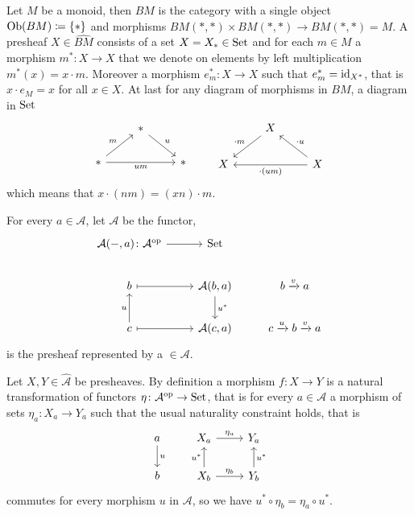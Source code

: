 \begin{exmp}
    Let $M$ be a monoid, then $BM$ is the category with a single object $\operatorname{Ob}(BM) \coloneqq \{*\}$ and morphisms $BM(*,*) \times BM(*,*) \to BM(*,*)=M$.
    A presheaf $X \in \widehat{BM}$ consists of a set $X=X_* \in \operatorname{Set}$ and for each $m \in M$ a morphism $m^*: X \to X$ that we denote on elements by left multiplication $m^*(x)=x \cdot m$.
    Moreover a morphism $e_m^*\colon X \to X$ such that $e_m^*=\operatorname{id}_{X^*}$, that is $x \cdot e_M=x$ for all $x \in X$.
    At last for any diagram of morphisms in $BM$, a diagram in $\operatorname{Set}$
    \[
    \begin{tikzcd}
        &
        *
        \arrow[rd,"u"]
        &
        \\
        *
        \arrow[ru,"m"]
        \arrow[rr,"um"']
        &
        &
        *
    \end{tikzcd}
    \qquad
    \begin{tikzcd}
        &
        X
        \arrow[ld,"\cdot m"']
        &
        \\
        X
        &
        &
        X
        \arrow[lu,"\cdot u"']
        \arrow[ll,"\cdot (um)"]
    \end{tikzcd}
    \]
    which means that $x\cdot (nm)=(xn)\cdot m$.
\end{exmp}

\begin{defi}
    For every $a\in \mathcal{A}$, let $\mathcal{A}$ be the functor,
    \[
    \begin{tikzcd}
        \mathcal{A}(-,a)\colon \mathcal{A}^{\op}
        \arrow[r]
        &
        \Set
        \\
        b
        \arrow[r, mapsto]
        &
        \mathcal{A}(b,a)
        \arrow[d,"u^*"]
        &
        b \xrightarrow{v} a
        \\
        c
        \arrow[u,"u"]
        \arrow[r, mapsto]
        &
        \mathcal{A}(c,a)
        &
        c \xrightarrow{u} b \xrightarrow{v}a
    \end{tikzcd}
    \]
    is the presheaf represented by a $\in \mathcal{A}$.
\end{defi}

Let $X,Y \in \widehat{\mathcal{A}}$ be presheaves. 
By definition a morphism $f\colon X \to Y$ is a natural transformation of functors $\eta \colon \mathcal{A}^{\operatorname{op}} \to \operatorname{Set}$, that is for every $a \in \mathcal{A}$ a morphism of sets $\eta_a:X_a \to Y_a$ such that the usual naturality constraint holds, that is 
    \[
    \begin{tikzcd}
        a
        \arrow[d, "u"]
        & 
        X_a
        \arrow[r, "\eta_a"]
        & 
        Y_a
        \\
        b
        &
        X_b
        \arrow[u,"u^*"]
        \arrow[r, "\eta_b"]
        &
        Y_b
        \arrow[u,"u^*"']
    \end{tikzcd}
    \]
commutes for every morphism $u$ in $\mathcal{A}$, so we have $u^* \circ \eta_b = \eta_a \circ u^*$.


